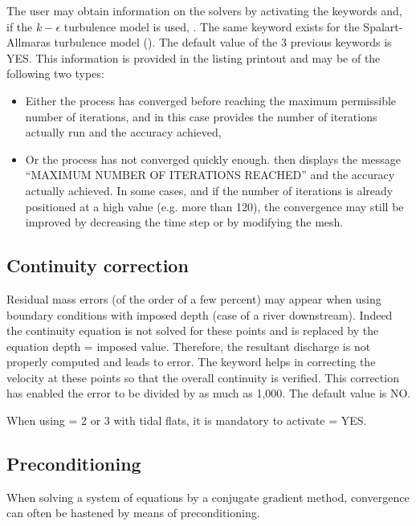 The user may obtain information on the solvers by activating the keywords
 and, if the $k-\epsilon$ turbulence model
is used, .
The same keyword exists for the Spalart-Allmaras turbulence model
().
The default value of the 3 previous keywords is YES.
This information is provided in the listing printout
and may be of the following two types:
\begin{itemize}
\item Either the process has converged before reaching the maximum permissible
number of iterations, and in this case  provides the number of
iterations actually run and the accuracy achieved,
\item Or the process has not converged quickly enough.
 then displays the message ``MAXIMUM NUMBER OF ITERATIONS REACHED''
and the accuracy actually achieved.
In some cases, and if the number of iterations is already positioned
at a high value (e.g. more than 120), the convergence may still be improved
by decreasing the time step or by modifying the mesh.
\end{itemize}

\subsection{Continuity correction}

Residual mass errors (of the order of a few percent) may appear when using
boundary conditions with imposed depth (case of a river downstream).
Indeed the continuity equation is not solved for these points and is replaced
by the equation depth = imposed value.
Therefore, the resultant discharge is not properly computed and leads to error.
The keyword  helps in correcting the velocity
at these points so that the overall continuity is verified.
This correction has enabled the error to be divided by as much as 1,000.
The default value is NO.

When using  = 2 or 3 with tidal flats,
it is mandatory to activate  = YES.


\subsection{Preconditioning}

When solving a system of equations by a conjugate gradient method,
convergence can often be hastened by means of preconditioning.

